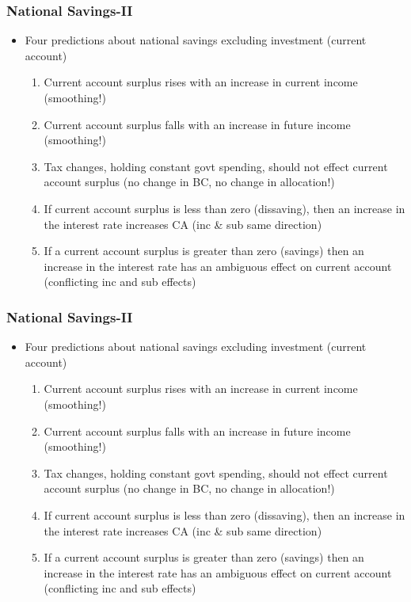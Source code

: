 \documentclass{beamer}
\begin{document}
\begin{frame}
\frametitle[alignment=center]{National Savings-II}
\begin{itemize}
\item Four predictions about national savings excluding investment (current account)
\bigskip
\begin{enumerate}
\item Current account surplus rises with an increase in current income (smoothing!)
\item Current account surplus falls with an increase in future income (smoothing!)
\item Tax changes, holding constant govt spending, should not effect current account surplus (no change in BC, no change in allocation!)
\item If current account surplus is less than zero (dissaving), then an increase in the interest rate increases CA (inc \& sub same direction)
\item If a current account surplus is greater than zero (savings) then an increase in the interest rate has an ambiguous effect on current account (conflicting inc and sub effects)
\end{enumerate}
\end{itemize}
\end{frame}


\begin{frame}
\frametitle[alignment=center]{National Savings-II}
\begin{itemize}
\item Four predictions about national savings excluding investment (current account)
\bigskip
\begin{enumerate}
\item Current account surplus rises with an increase in current income (smoothing!)
\item Current account surplus falls with an increase in future income (smoothing!)
\item Tax changes, holding constant govt spending, should not effect current account surplus (no change in BC, no change in allocation!)
\item If current account surplus is less than zero (dissaving), then an increase in the interest rate increases CA (inc \& sub same direction)
\item If a current account surplus is greater than zero (savings) then an increase in the interest rate has an ambiguous effect on current account (conflicting inc and sub effects)
\end{enumerate}
\end{itemize}
\end{frame}
\end{document}
